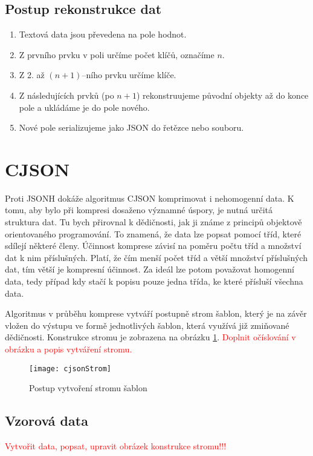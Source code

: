 \subsection{Postup rekonstrukce dat}
\begin{enumerate}
\item Textová data jsou převedena na pole hodnot.
\item Z prvního prvku v poli určíme počet klíčů, označíme $n$.
\item Z 2. až $(n+1)$--ního prvku určíme klíče.
\item Z následujících prvků (po $n+1$) rekonstruujeme původní objekty až do konce pole a ukládáme je do pole nového.
\item Nové pole serializujeme jako JSON do řetězce nebo souboru.
\end{enumerate}

\section{CJSON}
Proti JSONH dokáže algoritmus CJSON komprimovat i nehomogenní data. K tomu, aby bylo při kompresi dosaženo významné úspory, je nutná určitá struktura dat. Tu bych přirovnal k dědičnosti, jak ji známe z principů objektově orientovaného programování. To znamená, že data lze popsat pomocí tříd, které sdílejí některé členy. Účinnost komprese závisí na poměru počtu tříd a množství dat k nim příslušných. Platí, že čím menší počet tříd a větší množství příslušných dat, tím větší je kompresní účinnost. Za ideál lze potom považovat homogenní data, tedy případ kdy stačí k popisu pouze jedna třída, ke které přísluší všechna data.

Algoritmus v průběhu komprese vytváří postupně strom šablon, který je na závěr vložen do výstupu ve formě jednotlivých šablon, která využívá již zmiňované dědičnosti. Konstrukce stromu je zobrazena na obrázku \ref{cjsonKonstrukceStromu}. \textcolor{red}{Doplnit očíslování v obrázku a popis vytváření stromu.}

\begin{figure}[!htb]
\centering
\texttt{[image: cjsonStrom]}
\caption{Postup vytvoření stromu šablon}
\label{cjsonKonstrukceStromu}
\end{figure}

\subsection{Vzorová data}
\textcolor{red}{Vytvořit data, popsat, upravit obrázek konstrukce stromu!!!}

